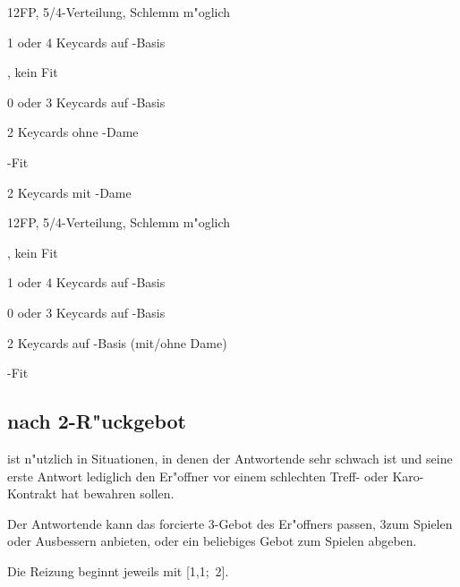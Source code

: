    \bdsc
      \item[3\coe] 12\pl FP, 5/4-Verteilung, Schlemm m"oglich
        \bdsc
          \item[3\pik] 1 oder 4 Keycards auf \ka-Basis
          \item[3\SA] \nat, kein Fit
          \item[4\tre] 0 oder 3 Keycards auf \ka-Basis
          \item[4\kar] 2 Keycards ohne \ka-Dame
          \item[4\coe] \co-Fit
          \item[4\pik] 2 Keycards mit \ka-Dame
        \edsc
      \item[3\pik] 12\pl FP, 5/4-Verteilung, Schlemm m"oglich
        \bdsc
          \item[3\SA] \nat, kein Fit
          \item[4\tre] 1 oder 4 Keycards auf \ka-Basis
          \item[4\kar] 0 oder 3 Keycards auf \ka-Basis
          \item[4\coe] 2 Keycards auf \ka-Basis (mit/ohne Dame)
          \item[4\pik] \pi-Fit
        \edsc
    \edsc
\edsc

\subsection{ nach 2\SA-R"uckgebot} \label{wolff}

 ist n"utzlich in Situationen, in denen der
Antwortende sehr schwach ist und seine erste Antwort lediglich den
Er"offner vor einem schlechten Treff- oder Karo-Kontrakt hat bewahren
sollen.

Der Antwortende kann das forcierte 3\kar-Gebot des Er"offners passen,
3\coe zum Spielen oder Ausbessern anbieten, oder ein beliebiges Gebot
zum Spielen abgeben.


Die Reizung beginnt jeweils mit [1\tre{}\sep1\pik;~2\SA{}].



%
%
